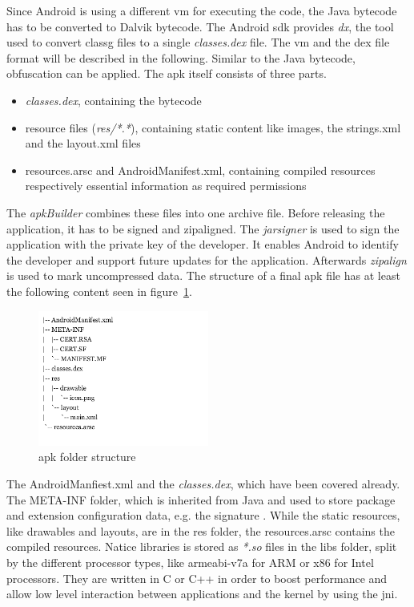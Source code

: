 \newline
Since Android is using a different \gls{vm} for executing the code, the Java bytecode has to be converted to Dalvik bytecode.
The Android \gls{sdk} provides \textit{dx}, the tool used to convert \gls{classg} files to a single \textit{classes.dex} file.
The \gls{vm} and the \gls{dex} file format will be described in the following.
Similar to the Java bytecode, obfuscation can be applied.
\newline
The \gls{apk} itself consists of three parts.
\begin{itemize}
\item \textit{classes.dex}, containing the bytecode
\item resource files (\textit{res/*.*}), containing static content like images, the strings.xml and the layout.xml files
\item resources.arsc and AndroidManifest.xml, containing compiled resources respectively essential information as required permissions
\end{itemize}
The \textit{apkBuilder} combines these files into one archive file.
\newline
Before releasing the application, it has to be signed and zipaligned.
The \textit{jarsigner} is used to sign the application with the private key of the developer.
It enables Android to identify the developer and support future updates for the application.
Afterwards \textit{zipalign} is used to mark uncompressed data. \cite{androidPublishSign} \cite{andevconDalvikART}
\newline
\newline
The structure of a final \gls{apk} file has at least the following content seen in figure~\ref{fig:apkfolder}.
\begin{figure}[h]
    \centering
    \includegraphics[width=0.5\textwidth]{data/apkfolder.png}
    \caption{\gls{apk} folder structure}
    \label{fig:apkfolder}
\end{figure}
The AndroidManfiest.xml and the \textit{classes.dex}, which have been covered already.
The META-INF folder, which is inherited from Java and used to store package and extension configuration data, e.g. the signature \cite{metaJava}.
While the static resources, like drawables and layouts, are in the res folder, the resources.arsc contains the compiled resources.
Natice libraries is stored as \textit{*.so} files in the libs folder, split by the different processor types, like armeabi-v7a for ARM or x86 for Intel processors.
They are written in C or C++ in order to boost performance and allow low level interaction between applications and the kernel by using the \gls{jni}. \cite{kovachevaMaster} \cite{ehringerDalvik}
